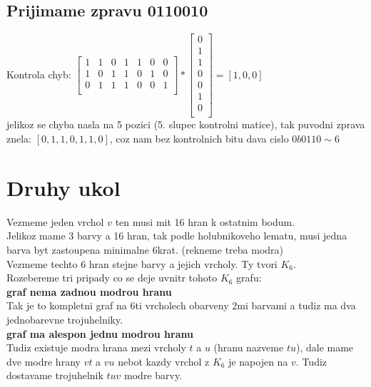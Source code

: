 \documentclass[a4paper]{article}
\begin{document}
\subsection*{Prijimame zpravu 0110010}
Kontrola chyb: $
\begin{bmatrix}
	1 & 1 & 0 & 1 & 1 & 0 & 0\\
	1 & 0 & 1 & 1 & 0 & 1 & 0\\
	0 & 1 & 1 & 1 & 0 & 0 & 1\\
\end{bmatrix}
*
\begin{bmatrix}
	0 \\
	1 \\
	1 \\
	0 \\
	0 \\
	1 \\
	0 \\
\end{bmatrix}
=
[1,0,0]
$\\
jelikoz se chyba nasla na 5 pozici (5. slupec kontrolni matice),
tak puvodni zprava znela: $[0,1,1,0,1,1,0]$,
coz nam bez kontrolnich bitu dava cislo $0b0110 \sim 6$ \\

\section*{Druhy ukol}
Vezmeme jeden vrchol $v$ ten musi mit 16 hran k ostatnim bodum.\\
Jelikoz mame 3 barvy a 16 hran, tak podle holubnikoveho lematu, 
musi jedna barva byt zastoupena minimalne 6krat. (rekneme treba modra)\\
Vezmeme techto 6 hran stejne barvy a jejich vrcholy. Ty tvori $K_6$.\\
Rozebereme tri pripady co se deje uvnitr tohoto $K_6$ grafu:\\
\textbf{graf nema zadnou modrou hranu} \\
Tak je to kompletni graf na 6ti vrcholech obarveny 2mi barvami
a tudiz ma dva jednobarevne trojuhelniky.\\
\textbf{graf ma alespon jednu modrou hranu} \\
Tudiz existuje modra hrana mezi vrcholy $t$ a $u$ (hranu nazveme $tu$),
dale mame dve modre hrany $vt$ a $vu$ nebot kazdy vrchol z $K_6$ je napojen na $v$.
Tudiz dostavame trojuhelnik $tuv$ modre barvy.
\end{document}

